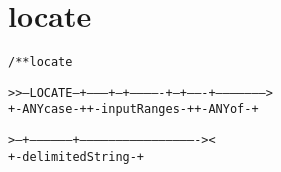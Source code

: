 \section{locate}
\begin{shaded}
\begin{alltt}
/** locate



   >>--LOCATE--+---------+--+-------------+--+-------+--------------------->
               +-ANYcase-+  +-inputRanges-+  +-ANYof-+

   >--+-----------------+-------------------------------------------------><
      +-delimitedString-+

\end{alltt}
\end{shaded}
